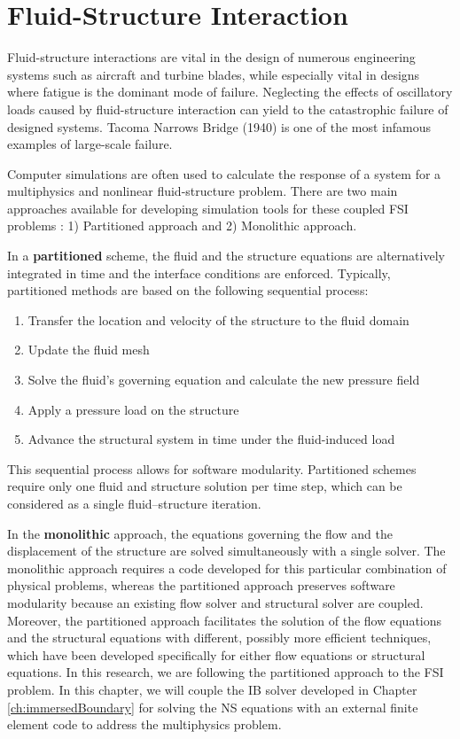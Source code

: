 \section{Fluid-Structure Interaction}
Fluid-structure interactions are vital in the design of numerous engineering systems such as aircraft and turbine blades, while especially vital in designs where fatigue is the dominant mode of failure. Neglecting the effects of oscillatory loads caused by fluid-structure interaction can yield to the catastrophic failure of designed systems. Tacoma Narrows Bridge (1940) is one of the most infamous examples of large-scale failure.

Computer simulations are often used to calculate the response of a system for a multiphysics and nonlinear fluid-structure problem. There are two main approaches available for developing simulation tools for these coupled FSI problems \cite{michler2004monolithic}: 1) Partitioned approach and 2) Monolithic approach.

In a \textbf{partitioned} scheme, the fluid and the structure equations are alternatively integrated in
time and the interface conditions are enforced. Typically, partitioned methods are based on the following sequential process:

\begin{enumerate}
	\item Transfer the location and velocity of the structure to the fluid domain
	\item Update the fluid mesh
	\item Solve the fluid's governing equation and calculate the new pressure field
	\item Apply a pressure load on the structure
	\item Advance the structural system in time under the fluid-induced load
\end{enumerate}

This sequential process allows for software modularity. Partitioned schemes require only one fluid
and structure solution per time step, which can be considered as a single fluid–structure iteration.

In the \textbf{monolithic} approach, the equations governing the flow and the displacement of the structure are solved simultaneously with a single solver. The monolithic approach requires a code developed for this particular combination of physical problems, whereas the partitioned approach preserves software modularity because an existing flow solver and structural solver are coupled. Moreover, the partitioned approach facilitates the solution of the flow equations and the structural equations with different, possibly more efficient techniques, which have been developed specifically for either flow equations or structural equations. In this research, we are following the partitioned approach to the FSI problem. In this chapter, we will couple the IB solver developed in Chapter \ref{ch:immersedBoundary} for solving the NS equations with an external finite element code to address the multiphysics problem.

